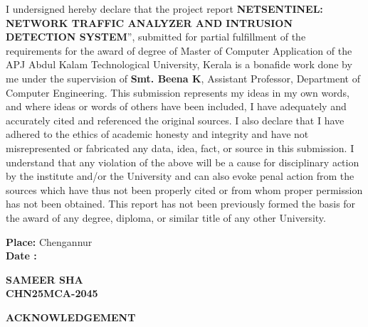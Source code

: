 \documentclass[a4paper,12pt]{report}
\newcommand{\studentname}{SAMEER SHA}
\newcommand{\rollno}{CHN25MCA-2045}
\newcommand{\guidename}{Smt. Beena K}
\begin{document}
	\noindent I undersigned hereby declare that the project report \textbf{NETSENTINEL: NETWORK TRAFFIC ANALYZER AND INTRUSION DETECTION SYSTEM}'', submitted for partial fulfillment of the requirements for the award of degree of Master of Computer Application of the APJ Abdul Kalam Technological University, Kerala is a bonafide work done by me under the supervision of \textbf{\guidename}, Assistant Professor, Department of Computer Engineering. This submission represents my ideas in my own words, and where ideas or words of others have been included, I have adequately and accurately cited and referenced the original sources. I also declare that I have adhered to the ethics of academic honesty and integrity and have not misrepresented or fabricated any data, idea, fact, or source in this submission. I understand that any violation of the above will be a cause for disciplinary action by the institute and/or the University and can also evoke penal action from the sources which have thus not been properly cited or from whom proper permission has not been obtained. This report has not been previously formed the basis for the award of any degree, diploma, or similar title of any other University.
	
	\vspace{3.5cm}
	
	\noindent\begin{minipage}{0.45\linewidth}
		\begin{flushleft}
			\textbf{Place:} Chengannur \\
			\textbf{Date :}
		\end{flushleft}
	\end{minipage}
	\hfill
	\begin{minipage}{0.45\linewidth}
		\begin{flushright}
			\textbf{\studentname}\\
			\textbf{\rollno}\\
		\end{flushright}
	\end{minipage}
	\clearpage
	
	\begin{center}
		\Large {\bf \uppercase{Acknowledgement}}
	\end{center}
	\vspace{1.2cm}
	
\end{document}
